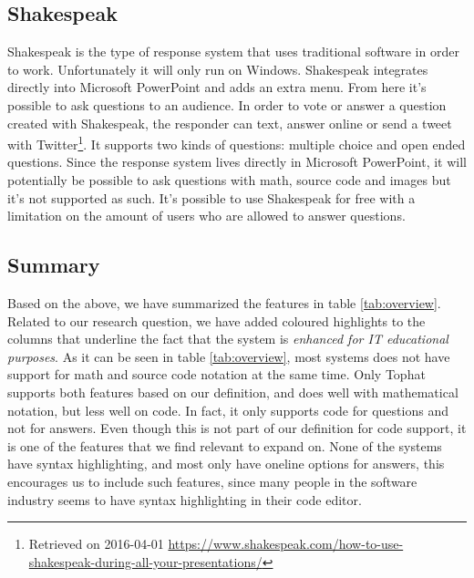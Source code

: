 \subsection*{Shakespeak}
Shakespeak is the type of response system that uses traditional software in order to work. Unfortunately it will only run on Windows. Shakespeak integrates directly into Microsoft PowerPoint and adds an extra menu. From here it's possible to ask questions to an audience. In order to vote or answer a question created with Shakespeak, the responder can text, answer online or send a tweet with Twitter\footnote{Retrieved on 2016-04-01 \url{https://www.shakespeak.com/how-to-use-shakespeak-during-all-your-presentations/}}. It supports two kinds of questions: multiple choice and open ended questions. Since the response system lives directly in Microsoft PowerPoint, it will potentially be possible to ask questions with math, source code and images but it's not supported as such. It's possible to use Shakespeak for free with a limitation on the amount of users who are allowed to answer questions.



\subsection{Summary}
Based on the above, we have summarized the features in table \ref{tab:overview}. Related to our research question, we have added coloured highlights to the columns that underline the fact that the system is \emph{enhanced for IT educational purposes}. As it can be seen in table \ref{tab:overview}, most systems does not have support for math and source code notation at the same time. Only Tophat supports both features based on our definition, and does well with mathematical notation, but less well on code. In fact, it only supports code for questions and not for answers. Even though this is not part of our definition for code support, it is one of the features that we find relevant to expand on.
None of the systems have syntax highlighting, and most only have oneline options for answers, this encourages us to include such features, since many people in the software industry seems to have syntax highlighting in their code editor. 




